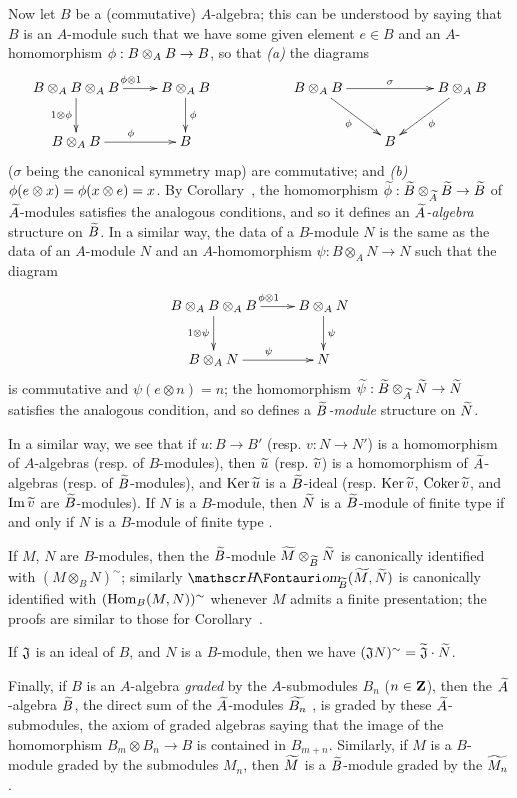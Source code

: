 \begin{env}[1.3.13]
\label{1.1.3.13}
Now let $B$ be a (commutative) $A$-algebra; this can be understood by saying that $B$ is an $A$-module such that we have some given element $e\in B$ and an $A$-homomorphism $\vphi:B\otimes_A B\to B$, so that \emph{(a)} the diagrams
\[
  \xymatrix{
    B\otimes_A B\otimes_A B\ar[r]^{\vphi\otimes 1}\ar[d]_{1\otimes\vphi} &
    B\otimes_A B\ar[d]^\vphi & &
    B\otimes_A B\ar[rr]^\sigma\ar[rd]_\vphi & &
    B\otimes_A B\ar[dl]^\vphi\\
    B\otimes_A B\ar[r]^\vphi &
    B & & &
    B
  }
\]
($\sigma$ being the canonical symmetry map) are commutative; and \emph{(b)} $\phi(e\otimes x)=\phi(x\otimes e)=x$.
By Corollary~, the homomorphism $\wt{\vphi}:\wt{B}\otimes_\wt{A}\wt{B}\to\wt{B}$ of ${\widetilde{A}}$-modules satisfies the analogous conditions, and so it defines an \emph{${\widetilde{A}}$-algebra} structure on ${\widetilde{B}}$.
In a similar way, the data of a $B$-module $N$ is the same as the data of an $A$-module $N$ and an $A$-homomorphism $\psi:B\otimes_A N\to N$ such that the diagram
\[
  \xymatrix{
    B\otimes_A B\otimes_A B\ar[r]^{\vphi\otimes 1}\ar[d]_{1\otimes\psi} &
    B\otimes_A N\ar[d]^\psi\\
    B\otimes_A N\ar[r]^\psi &
    N
  }
\]
is commutative and $\psi(e\otimes n)=n$;
the homomorphism $\wt{\psi}:\wt{B}\otimes_\wt{A}\wt{N}\to\wt{N}$ satisfies the analogous condition, and so defines a \emph{${\widetilde{B}}$-module} structure on ${\widetilde{N}}$.

In a similar way, we see that if $u:B\to B'$ (resp. $v:N\to N'$) is a homomorphism of $A$-algebras (resp. of $B$-modules), then ${\widetilde{u}}$ (resp. ${\widetilde{v}}$) is a homomorphism of ${\widetilde{A}}$-algebras (resp. of ${\widetilde{B}}$-modules), and ${\mathop{\mathrm{Ker}}\nolimits}\,{\widetilde{u}}$ is a ${\widetilde{B}}$-ideal (resp. ${\mathop{\mathrm{Ker}}\nolimits}\,{\widetilde{v}}$, ${\mathop{\mathrm{Coker}}\nolimits}\,{\widetilde{v}}$, and ${\mathop{\mathrm{Im}}\nolimits}\,{\widetilde{v}}$ are ${\widetilde{B}}$-modules).
If $N$ is a $B$-module, then ${\widetilde{N}}$ is a ${\widetilde{B}}$-module of finite type if and only if $N$ is a $B$-module of finite type .

If $M$, $N$ are $B$-modules, then the ${\widetilde{B}}$-module ${\widetilde{M}}\otimes_{\widetilde{B}}{\widetilde{N}}$ is canonically identified with $(M\otimes_B N)^\sim$;
similarly $\shHom_\wt{B}(\wt{M},\wt{N})$ is canonically identified with $({\mathop{\mathrm{Hom}}\nolimits}_B(M,N))^\sim$ whenever $M$ admits a finite presentation;
the proofs are similar to those for Corollary~.

If $\mathfrak{J}$ is an ideal of $B$, and $N$ is a $B$-module, then we have $(\mathfrak{J}N)^\sim={\widetilde{\mathfrak{J}}}\cdot{\widetilde{N}}$.

Finally, if $B$ is an $A$-algebra \emph{graded} by the $A$-submodules $B_n$ ($n\in\mathbf{Z}$), then the ${\widetilde{A}}$-algebra ${\widetilde{B}}$, the direct sum of the ${\widetilde{A}}$-modules ${\widetilde{B_n}}$ , is graded by these ${\widetilde{A}}$-submodules, the axiom of graded algebras saying that the image of the homomorphism $B_m\otimes B_n\to B$ is contained in $B_{m+n}$.
Similarly, if $M$ is a $B$-module graded by the submodules $M_n$, then ${\widetilde{M}}$ is a ${\widetilde{B}}$-module graded by the ${\widetilde{M_n}}$.
\end{env}

